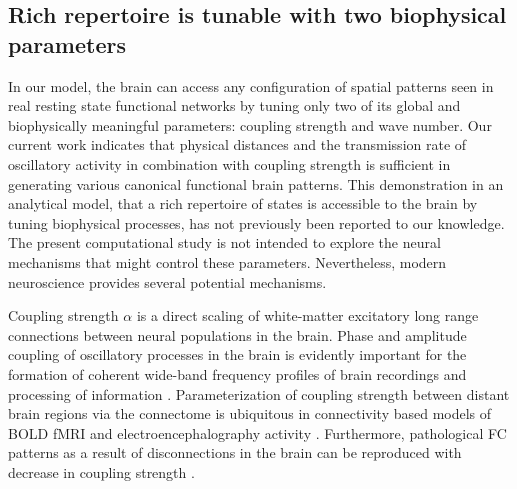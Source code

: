 \subsection{Rich repertoire is tunable with two biophysical parameters}
In our model, the brain can access any configuration of spatial patterns seen in real resting state functional networks by tuning only two of its global and biophysically meaningful parameters: coupling strength and wave number. Our current work indicates that physical distances and the transmission rate of oscillatory activity in combination with coupling strength is sufficient in generating various canonical functional brain patterns. This demonstration in an analytical model, that a rich repertoire of states is accessible to the brain by tuning biophysical processes, has not previously been reported to our knowledge. The present computational study is not intended to explore the neural mechanisms that might control these parameters. Nevertheless, modern neuroscience provides several potential mechanisms. 

Coupling strength $\alpha$ is a direct scaling of white-matter excitatory long range connections between neural populations in the brain. Phase and amplitude coupling of oscillatory processes in the brain is evidently important for the formation of coherent wide-band frequency profiles of brain recordings and processing of information \cite{fries_mechanism_2005, schnitzler_normal_2005, varela_brainweb_2001, ghosh_cortical_2008, Deco2009}. Parameterization of coupling strength between distant brain regions via the connectome is ubiquitous in connectivity based models of BOLD fMRI \cite{Honey2007, Deco2009, honey_predicting_2009, abdelnour_network_2014} and electroencephalography activity \cite{Ghosh2008, Spiegler2013, david_neural_2003}. Furthermore, pathological FC patterns as a result of disconnections in the brain can be reproduced with decrease in coupling strength \cite{cabral_modeling_2012, Jirsa2010}. 

